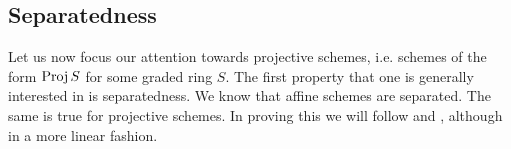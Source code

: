 \documentclass{article}
\begin{document}

\subsection{Separatedness}

Let us now focus our attention towards projective schemes, i.e. schemes
of the form $\operatorname{Proj} S$ for some graded ring $S$. The first property that
one is generally interested in is separatedness. We know that affine schemes are separated. The same is true for projective schemes. In proving
this we will follow \cite[\href{https://stacks.math.columbia.edu/tag/01KP}{Tag 01KP}]{stacks-project} and \cite[\href{https://stacks.math.columbia.edu/tag/01M3}{Tag 01M3}]{stacks-project}, although in a more linear fashion.
\end{document}
